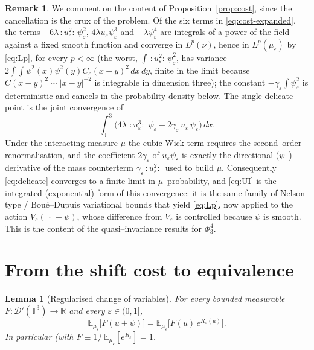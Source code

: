 \documentclass[12pt]{article}
\newtheorem{lemma}{Lemma}
\theoremstyle{definition}
\newtheorem{remark}{Remark}
\newcommand{\T}{\mathbb{T}^3}
\newcommand{\R}{\mathbb{R}}
\newcommand{\E}{\mathbb{E}}
\newcommand{\D}{\mathcal{D}'(\T)}
\newcommand{\Wick}[1]{\,{:}#1{:}\,}
\begin{document}
\begin{remark}\label{rem:cost}
We comment on the content of Proposition~\ref{prop:cost}, since the cancellation is the
crux of the problem. Of the six terms in \eqref{eq:cost-expanded}, the terms
$-6\lambda\Wick{u_\varepsilon^2}\psi^2_\varepsilon$, $4\lambda u_\varepsilon\psi_\varepsilon^3$
and $-\lambda\psi_\varepsilon^4$ are integrals of a power of the field against a fixed
smooth function and converge in $L^p(\nu)$, hence in $L^p(\mu_\varepsilon)$ by
\eqref{eq:Lp}, for every $p<\infty$ (the worst, $\int\Wick{u_\varepsilon^2}\psi^2_\varepsilon$,
has variance $2\int\!\!\int\psi^2(x)\psi^2(y)C_\varepsilon(x-y)^2\,dx\,dy$, finite in the
limit because $C(x-y)^2\sim|x-y|^{-2}$ is integrable in dimension three); the constant
$-\gamma_\varepsilon\int\psi_\varepsilon^2$ is deterministic and cancels in the
probability density below. The single delicate point is the joint convergence of
\begin{equation}\label{eq:delicate}
  \int_\T\Big(4\lambda\,\Wick{u_\varepsilon^3}\,\psi_\varepsilon
     +2\gamma_\varepsilon\,u_\varepsilon\,\psi_\varepsilon\Big)\,dx .
\end{equation}
Under the interacting measure $\mu$ the cubic Wick term requires the second--order
renormalisation, and the coefficient $2\gamma_\varepsilon$ of $u_\varepsilon\psi_\varepsilon$
is exactly the directional ($\psi$--) derivative of the mass counterterm
$\gamma_\varepsilon\Wick{u_\varepsilon^2}$ used to build $\mu$. Consequently
\eqref{eq:delicate} converges to a finite limit in $\mu$--probability, and \eqref{eq:UI}
is the integrated (exponential) form of this convergence: it is the same family of
Nelson--type / Bou\'e--Dupuis variational bounds that yield \eqref{eq:Lp}, now applied to
the action $V_\varepsilon(\,\cdot\,-\psi)$, whose difference from $V_\varepsilon$ is
controlled because $\psi$ is smooth. This is the content of the quasi--invariance results
for $\Phi^4_3$.
\end{remark}

\section{From the shift cost to equivalence}

\begin{lemma}[Regularised change of variables]\label{lem:cov}
For every bounded measurable $F\colon\D\to\R$ and every $\varepsilon\in(0,1]$,
\begin{equation}\label{eq:cov}
  \E_{\mu_\varepsilon}\!\big[F(u+\psi)\big]
  =\E_{\mu_\varepsilon}\!\big[F(u)\,e^{R_\varepsilon(u)}\big].
\end{equation}
In particular (with $F\equiv1$) $\E_{\mu_\varepsilon}[e^{R_\varepsilon}]=1$.
\end{lemma}
\end{document}
